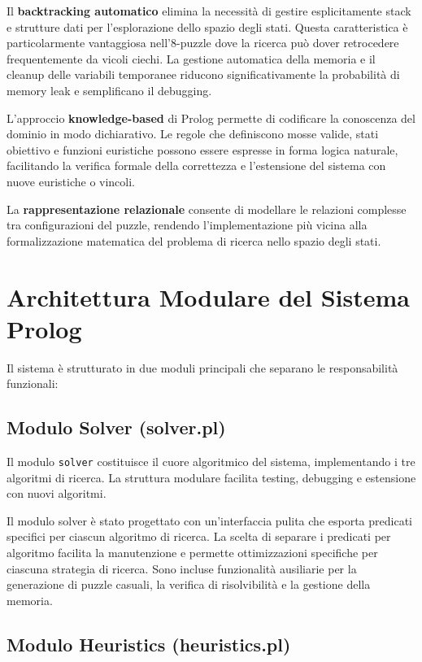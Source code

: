 \documentclass[12pt,a4paper]{report}
\theoremstyle{definition}
\begin{document}
Il \textbf{backtracking automatico} elimina la necessità di gestire esplicitamente stack e strutture dati per l'esplorazione dello spazio degli stati. Questa caratteristica è particolarmente vantaggiosa nell'8-puzzle dove la ricerca può dover retrocedere frequentemente da vicoli ciechi. La gestione automatica della memoria e il cleanup delle variabili temporanee riducono significativamente la probabilità di memory leak e semplificano il debugging.

L'approccio \textbf{knowledge-based} di Prolog permette di codificare la conoscenza del dominio in modo dichiarativo. Le regole che definiscono mosse valide, stati obiettivo e funzioni euristiche possono essere espresse in forma logica naturale, facilitando la verifica formale della correttezza e l'estensione del sistema con nuove euristiche o vincoli.

La \textbf{rappresentazione relazionale} consente di modellare le relazioni complesse tra configurazioni del puzzle, rendendo l'implementazione più vicina alla formalizzazione matematica del problema di ricerca nello spazio degli stati.

\section{Architettura Modulare del Sistema Prolog}

Il sistema è strutturato in due moduli principali che separano le responsabilità funzionali:

\subsection{Modulo Solver (solver.pl)}

Il modulo \texttt{solver} costituisce il cuore algoritmico del sistema, implementando i tre algoritmi di ricerca. La struttura modulare facilita testing, debugging e estensione con nuovi algoritmi.

Il modulo solver è stato progettato con un'interfaccia pulita che esporta predicati specifici per ciascun algoritmo di ricerca. La scelta di separare i predicati per algoritmo facilita la manutenzione e permette ottimizzazioni specifiche per ciascuna strategia di ricerca. Sono incluse funzionalità ausiliarie per la generazione di puzzle casuali, la verifica di risolvibilità e la gestione della memoria.

\subsection{Modulo Heuristics (heuristics.pl)}
\end{document}
